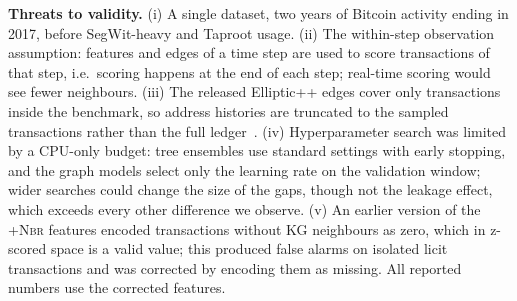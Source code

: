 \textbf{Threats to validity.} (i) A single dataset, two years of Bitcoin
activity ending in 2017, before SegWit-heavy and Taproot usage. (ii) The
within-step observation assumption: features and edges of a time step are
used to score transactions of that step, i.e.\ scoring happens at the end of
each step; real-time scoring would see fewer neighbours. (iii) The released
Elliptic++ edges cover only transactions inside the benchmark, so address
histories are truncated to the sampled transactions rather than the full
ledger~\cite{safar2026}. (iv) Hyperparameter search was limited by a CPU-only
budget: tree ensembles use standard settings with early stopping, and the
graph models select only the learning rate on the validation window; wider
searches could change the size of the gaps, though not the leakage effect,
which exceeds every other difference we observe. (v) An earlier version of
the \textsc{+Nbr} features encoded transactions without KG neighbours as zero,
which in z-scored space is a valid value; this produced false alarms on
isolated licit transactions and was corrected by encoding them as missing.
All reported numbers use the corrected features.
